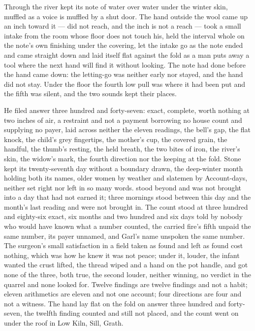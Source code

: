 Through  the river kept its note of water over water under the winter skin, muffled as a voice is muffled by a shut door. The hand outside the wool came up an inch toward it --- did not reach, and the inch is not a reach --- took a small intake from the room whose floor does not touch his, held the interval whole on the note's own finishing under the covering, let the intake go as the note ended and came straight down and laid itself flat against the fold as a man puts away a tool where the next hand will find it without looking. The note had done before the hand came down: the letting-go was neither early nor stayed, and the hand did not stay. Under the floor the fourth low pull was where it had been put and the fifth was silent, and the two sounds kept their places.

He filed answer three hundred and forty-seven: exact, complete, worth nothing at two inches of air, a restraint and not a payment borrowing no house count and supplying no payer, laid across neither the eleven readings, the bell's gap, the flat knock, the child's grey fingertips, the mother's cup, the covered grain, the handful, the thumb's resting, the held breath, the two bites of iron, the river's skin, the widow's mark, the fourth direction nor the keeping at the fold. Stone kept its twenty-seventh day without a boundary drawn, the deep-winter month holding both its names, older women by weather and slatemen by  Account-days, neither set right nor left in so many words.  stood beyond and was not brought into a day that had not earned it; three mornings stood between this day and the month's last reading and were not brought in. The count stood at three hundred and eighty-six exact, six months and two hundred and six days told by nobody who would have known what a number counted, the carried fire's fifth unpaid the same number, its payer unnamed, and Garl's name unspoken the same number. The surgeon's small satisfaction in a field taken as found and left as found cost nothing, which was how he knew it was not peace; under it, louder, the infant wanted the crust lifted, the thread wiped and a hand on the pot handle, and got none of the three, both true, the second louder, neither winning, no verdict in the quarrel and none looked for. Twelve findings are twelve findings and not a habit; eleven arithmetics are eleven and not one account; four directions are four and not a witness. The hand lay flat on the fold on answer three hundred and forty-seven, the twelfth finding counted and still not placed, and the count went on under the roof in Low Kiln, Sill, Grath.
